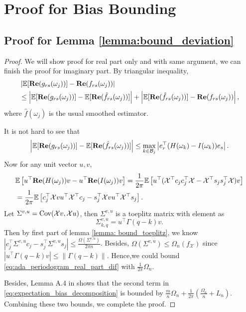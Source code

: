 \section{Proof for Bias Bounding}
\subsection{Proof for Lemma \ref{lemma:bound_deviation}}
\begin{proof}
We will show proof for real part only and with same argument, we can finish the proof for imaginary part. By triangular inequality, 
\begin{equation}
\label{eq:expectation_bias_decomposition}
\begin{aligned}
&\left|\mathbb{E}[{\bf Re}(g_{rs}(\omega_j))] - {\bf Re}(f_{rs}(\omega_j))\right| \\
&\le \left|\mathbb{E}[{\bf Re}(g_{rs}(\omega_j))] - \mathbb{E}[{\bf Re}(\hat{f}_{rs}(\omega_j))] \right| + \left|\mathbb{E}[{\bf Re}(\hat{f}_{rs}(\omega_j))] - {\bf Re}(f_{rs}(\omega_j))\right|,
\end{aligned}
\end{equation}
where $\hat{f}(\omega_j)$ is the usual smoothed estimator. \par 
It is not hard to see that 
\begin{equation}
\left|\mathbb{E}[{\bf Re}(g_{rs}(\omega_j))] - \mathbb{E}[{\bf Re}(\hat{f}_{rs}(\omega_j))] \right| \le \max_{k\in \mathcal{B}_j} \left| e_r^\top   (H(\omega_k) - I(\omega_k)) e_s\right|. 
\end{equation}
Now for any unit vector $u,v$, 
\begin{equation}
\begin{aligned}
\label{eq:ada_periodogram_real_part_dif}
&\mathbb{E} \left [u^\top  {\bf Re}(H(\omega_j))v - u^\top  {\bf Re}(I(\omega_j))v\right] = \frac{1}{2\pi} \mathbb{E}\left[u^\top  (\mathcal{X}^\top  c_jc_j^\top   \mathcal{X} -  \mathcal{X}^\top  s_js_j^\top   \mathcal{X})v\right]\\
&=\frac{1}{2\pi} \mathbb{E}\left[c_j^\top   \mathcal{X}vu^\top  \mathcal{X}^\top   c_j - s_j^\top   \mathcal{X}vu^\top   \mathcal{X}^\top  s_j\right].
\end{aligned}
\end{equation}
Let $\Sigma^{v,u} = \mbox{Cov}(\mathcal{X}v, \mathcal{X}u)$, then $\Sigma^{v,u}$ is a toeplitz matrix with element as 
\begin{equation}
\Sigma^{v,u}_{k,q} = u^\top  \Gamma(q-k)v.
\end{equation}
Then by first part of lemma \ref{lemma: bound_toeplitz}, we know $\left|c_j^\top  \Sigma^{v,u}c_j-s_j^\top  \Sigma^{v,u}s_j\right|\le \frac{\Omega(\Sigma^{v,u})}{2\pi n}$. Besides, $\Omega(\Sigma^{v,u}) \le \Omega_n(f_\mathcal{X})$ since  $\left|u^\top  \Gamma(q-k)v\right| \le \|\Gamma(q-k) \| $. Hence,we could bound \eqref{eq:ada_periodogram_real_part_dif} with $\frac{1}{2\pi} \Omega_n$. \par 
Besides, Lemma A.4 in \cite{sun2018large} shows that the second term in \eqref{eq:expectation_bias_decomposition} is bounded by $\frac{m}{n}\Omega_n + \frac{1}{2\pi}\left(\frac{\Omega_n}{n}+L_n\right)$. Combining these two bounds, we complete the proof. 
 \end{proof}
 
